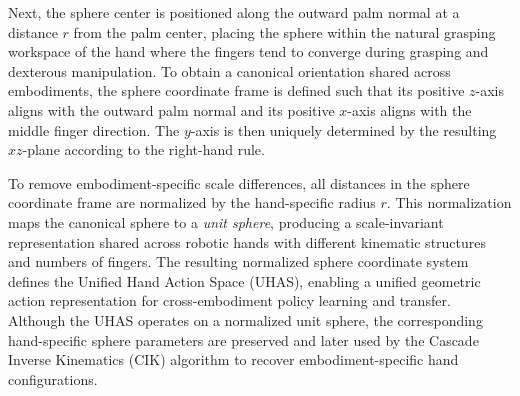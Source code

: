 Next, the sphere center is positioned along the outward palm normal at a distance $r$ from the palm center, placing the sphere within the natural grasping workspace of the hand where the fingers tend to converge during grasping and dexterous manipulation. To obtain a canonical orientation shared across embodiments, the sphere coordinate frame is defined such that its positive $z$-axis aligns with the outward palm normal and its positive $x$-axis aligns with the middle finger direction. The $y$-axis is then uniquely determined by the resulting $xz$-plane according to the right-hand rule.

To remove embodiment-specific scale differences, all distances in the sphere coordinate frame are normalized by the hand-specific radius $r$. This normalization maps the canonical sphere to a \emph{unit sphere}, producing a scale-invariant representation shared across robotic hands with different kinematic structures and numbers of fingers. The resulting normalized sphere coordinate system defines the Unified Hand Action Space (UHAS), enabling a unified geometric action representation for cross-embodiment policy learning and transfer. Although the UHAS operates on a normalized unit sphere, the corresponding hand-specific sphere parameters are preserved and later used by the Cascade Inverse Kinematics (CIK) algorithm to recover embodiment-specific hand configurations.








